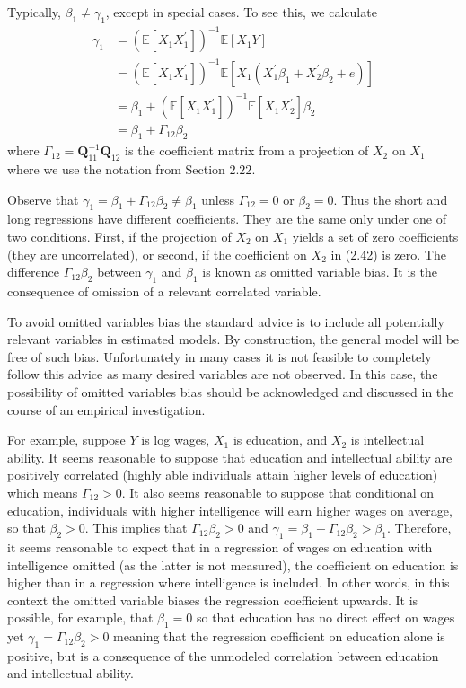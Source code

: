 \documentclass[10pt]{article}
\begin{document}
Typically, $\beta_{1} \neq \gamma_{1}$, except in special cases. To see this, we calculate
$$
\begin{aligned}
\gamma_{1} &=\left(\mathbb{E}\left[X_{1} X_{1}^{\prime}\right]\right)^{-1} \mathbb{E}\left[X_{1} Y\right] \\
&=\left(\mathbb{E}\left[X_{1} X_{1}^{\prime}\right]\right)^{-1} \mathbb{E}\left[X_{1}\left(X_{1}^{\prime} \beta_{1}+X_{2}^{\prime} \beta_{2}+e\right)\right] \\
&=\beta_{1}+\left(\mathbb{E}\left[X_{1} X_{1}^{\prime}\right]\right)^{-1} \mathbb{E}\left[X_{1} X_{2}^{\prime}\right] \beta_{2} \\
&=\beta_{1}+\Gamma_{12} \beta_{2}
\end{aligned}
$$
where $\Gamma_{12}=\boldsymbol{Q}_{11}^{-1} \boldsymbol{Q}_{12}$ is the coefficient matrix from a projection of $X_{2}$ on $X_{1}$ where we use the notation from Section $2.22$.

Observe that $\gamma_{1}=\beta_{1}+\Gamma_{12} \beta_{2} \neq \beta_{1}$ unless $\Gamma_{12}=0$ or $\beta_{2}=0$. Thus the short and long regressions have different coefficients. They are the same only under one of two conditions. First, if the projection of $X_{2}$ on $X_{1}$ yields a set of zero coefficients (they are uncorrelated), or second, if the coefficient on $X_{2}$ in (2.42) is zero. The difference $\Gamma_{12} \beta_{2}$ between $\gamma_{1}$ and $\beta_{1}$ is known as omitted variable bias. It is the consequence of omission of a relevant correlated variable.

To avoid omitted variables bias the standard advice is to include all potentially relevant variables in estimated models. By construction, the general model will be free of such bias. Unfortunately in many cases it is not feasible to completely follow this advice as many desired variables are not observed. In this case, the possibility of omitted variables bias should be acknowledged and discussed in the course of an empirical investigation.

For example, suppose $Y$ is log wages, $X_{1}$ is education, and $X_{2}$ is intellectual ability. It seems reasonable to suppose that education and intellectual ability are positively correlated (highly able individuals attain higher levels of education) which means $\Gamma_{12}>0$. It also seems reasonable to suppose that conditional on education, individuals with higher intelligence will earn higher wages on average, so that $\beta_{2}>0$. This implies that $\Gamma_{12} \beta_{2}>0$ and $\gamma_{1}=\beta_{1}+\Gamma_{12} \beta_{2}>\beta_{1}$. Therefore, it seems reasonable to expect that in a regression of wages on education with intelligence omitted (as the latter is not measured), the coefficient on education is higher than in a regression where intelligence is included. In other words, in this context the omitted variable biases the regression coefficient upwards. It is possible, for example, that $\beta_{1}=0$ so that education has no direct effect on wages yet $\gamma_{1}=\Gamma_{12} \beta_{2}>0$ meaning that the regression coefficient on education alone is positive, but is a consequence of the unmodeled correlation between education and intellectual ability.
\end{document}
